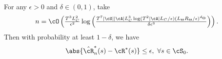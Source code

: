 \documentclass[9pt]{article}
\numberwithin{equation}{section}
\begin{document}
%
\begin{theorem}\label{thrm_sample_fin_mdpite_opt}
For any $\epsilon > 0$ and $\delta \in (0,1)$, take
%
\begin{align}
    n = \cO\left( \tfrac{T^3 L_C^2}{\epsilon^2} \log \left(\tfrac{T^7 |\cS| |\cA| L_C^3 \log(T^2|\cA|L_C/\epsilon) (L_\Theta R_\Theta/\epsilon)^{d_\Theta}}{\delta \epsilon^3} \right)\right). \nonumber
\end{align}
%
Then with probability at least $1-\delta$, we have
%
\begin{align}
    \abs{ \hat{\cR}^*_n (s) - \cR^* (s)  } \leq \epsilon, ~  \forall s \in \cS_0. \nonumber
\end{align}
\end{theorem}
\end{document}
